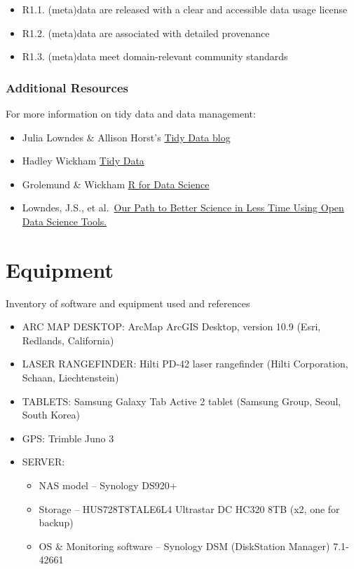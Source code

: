 \documentclass[
]{book}
\providecommand{\tightlist}{%
  \setlength{\itemsep}{0pt}\setlength{\parskip}{0pt}}
\begin{document}
\begin{enumerate}
\begin{itemize}
    \begin{itemize}
    \tightlist
    \item
      R1.1. (meta)data are released with a clear and accessible data usage license
    \item
      R1.2. (meta)data are associated with detailed provenance
    \item
      R1.3. (meta)data meet domain-relevant community standards
    \end{itemize}
  \end{itemize}
\end{enumerate}

\hypertarget{additional-resources-1}{%
\subsection{Additional Resources}\label{additional-resources-1}}

For more information on tidy data and data management:

\begin{itemize}
\tightlist
\item
  Julia Lowndes \& Allison Horst's \href{https://www.openscapes.org/blog/2020/10/12/tidy-data/}{Tidy Data blog}
\item
  Hadley Wickham \href{https://vita.had.co.nz/papers/tidy-data.pdf}{Tidy Data}
\item
  Grolemund \& Wickham \href{https://r4ds.had.co.nz/}{R for Data Science}
\item
  Lowndes, J.S., et al.~\href{https://www.nature.com/articles/s41559-017-0160}{Our Path to Better Science in Less Time Using Open Data Science Tools.}
\end{itemize}

\hypertarget{equipment}{%
\chapter{Equipment}\label{equipment}}

Inventory of software and equipment used and references

\begin{itemize}
\item
  ARC MAP DESKTOP: ArcMap ArcGIS Desktop, version 10.9 (Esri, Redlands, California)
\item
  LASER RANGEFINDER: Hilti PD-42 laser rangefinder (Hilti Corporation, Schaan, Liechtenstein)
\item
  TABLETS: Samsung Galaxy Tab Active 2 tablet (Samsung Group, Seoul, South Korea)
\item
  GPS: Trimble Juno 3
\item
  SERVER:

  \begin{itemize}
  \tightlist
  \item
    NAS model -- Synology DS920+
  \item
    Storage -- HUS728T8TALE6L4 Ultrastar DC HC320 8TB (x2, one for backup)
  \item
    OS \& Monitoring software -- Synology DSM (DiskStation Manager) 7.1-42661
  \end{itemize}
\end{itemize}
\end{document}
